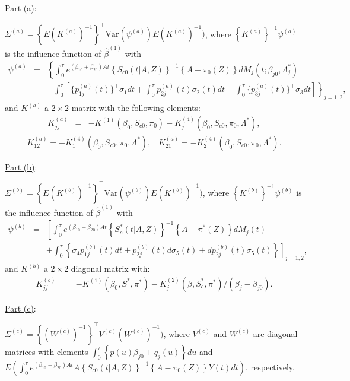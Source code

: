 \documentclass[11pt]{article}
\newcommand{\eqnn}{\begin{eqnarray*}}
\newcommand{\een}{\end{eqnarray*}}
\begin{document}

\underline{Part (a)}:

$\Sigma^{(a)}=\left\{{E}(K^{(a)})^{-1}\right\}^\top \mbox{Var}(\psi^{(a)}){E}(K^{(a)})^{-1})$, where
$\left\{K^{(a)}\right\}^{-1}\psi^{(a)}$ is the influence function of $\hat \beta^{(1)}$ with
\eqnn
\psi^{(a)} &=&\left\{\int_0^\tau e^{ (\beta_{10}  + \beta_{20}) A t} \left\{S_{c0}(t | A,Z)\right\}^{-1}\left\{A -\pi_{0}( Z)\right\}dM_{j}(t; \beta_{j0},\Lambda^{*}_j)\right.\\&&\left.+\int_0^\tau \left[\{p^{(a)}_{1j}(t)\}^\top \sigma_{1}dt+\int_0^\tau p^{(a)}_{2j}(t)  \sigma_{2}(t)dt-\int_0^\tau \{p^{(a)}_{3j}(t)\}^\top  \sigma_{3} dt \right]\right\}_{j=1,2},
\een
and ${K^{(a)}}$  a $2\times2$ matrix with the following elements:
\eqnn
{K}^{(a)}_{jj}&=&-K^{(1)}(\beta_0,S_{c0},\pi_0)-K^{(4)}_j(\beta_0,S_{c0},\pi_0,\Lambda^{*}),
\een
\eqnn
{K}^{(a)}_{12}=-K^{(4)}_{1}(\beta_0,S_{c0},\pi_0,\Lambda^{*}),\;\;\;{K}^{(a)}_{21}=-K^{(4)}_{2}(\beta_0,S_{c0},\pi_0,\Lambda^{*}).
\een


\underline{Part (b)}:

$\Sigma^{(b)}=\left\{{E}(K^{(b)})^{-1}\right\}^\top \mbox{Var}(\psi^{(b)}){E}(K^{(b)})^{-1})$, where
$\left\{K^{(b)}\right\}^{-1}\psi^{(b)}$ is the influence function of $\hat \beta^{(1)}$ with
\eqnn
\psi^{(b)}&=&\left[\int_0^\tau e^{ (\beta_{10}  + \beta_{20}) A t} \left\{S^{*}_{c}(t | A,Z)\right\}^{-1}\left\{A -\pi^{*}( Z)\right\}dM_{j}(t)\right.\\&&\left.+\int_0^\tau \left\{ \sigma_{4} p^{(b)}_{1j}(t)dt+p^{(b)}_{2j}(t)d\sigma_{5}(t)+dp^{(b)}_{2j}(t)\sigma_{5}(t)\right\}\right]_{j=1,2},\een
and ${K^{(b)}}$  a $2\times2$ diagonal matrix with:
\eqnn
{K}^{(b)}_{jj}&=&-K^{(1)}(\beta_0,S^{*},\pi^{*})-K^{(2)}_j(\beta,S^{*}_c, \pi^{*})/(\beta_j-\beta_{j0}).
\een


\underline{Part (c)}:

  $\Sigma^{(c)}=\left\{(W^{(c)})^{-1}\right\}^\top V^{(c)} (W^{(c)})^{-1})$, where $V^{(c)}$ and $W^{(c)}$ are diagonal matrices with elements $\int_0^\tau  \left\{p(u)\beta_{j0}+q_j(u)\right\}du$ and 
${E}\left(\int_0^\tau e^{ (\beta_{10}  + \beta_{20}) A t}A\left\{S_{c0}(t | A,Z)\right\}^{-1}\left\{A - \pi_{0}( Z)\right\}Y(t)dt\right)$, respectively.
\end{document}
